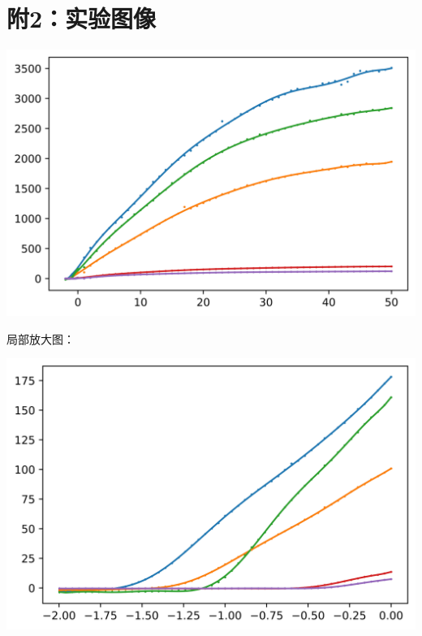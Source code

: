 \documentclass[a4paper]{ltxdoc}
\newenvironment{Figure}
  {\par\medskip\noindent\minipage{\linewidth}}
  {\endminipage\par\medskip}
\begin{document}
\section*{附2：实验图像}
\begin{Figure}
    \centering
    \includegraphics[width=\linewidth]{img/13.jpg}
\end{Figure}
\begin{Figure}
    \centering
    \large{局部放大图：}

    \includegraphics[width=\linewidth]{img/14.jpg}
\end{Figure}
\end{document}
